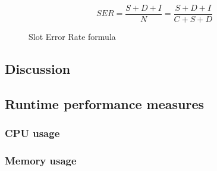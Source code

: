 \begin{figure}[H]
\begin{displaymath}
	SER = \frac{S+D+I}{N} = \frac{S+D+I}{C+S+D}
\end{displaymath}
\caption{Slot Error Rate formula}
\end{figure}

\subsection{Discussion}

\subsection{Runtime performance measures}

\subsubsection{CPU usage}
\subsubsection{Memory usage}